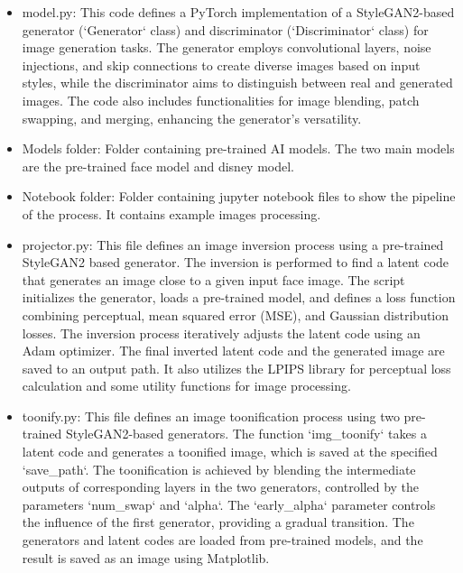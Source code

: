 \documentclass[conference]{IEEEtran}
\begin{document}
\begin{itemize}
                \vspace{3mm}
                \item model.py: This code defines a PyTorch implementation of a StyleGAN2-based generator (`Generator` class) and discriminator (`Discriminator` class) for image generation tasks. The generator employs convolutional layers, noise injections, and skip connections to create diverse images based on input styles, while the discriminator aims to distinguish between real and generated images. The code also includes functionalities for image blending, patch swapping, and merging, enhancing the generator's versatility.\\
                \vspace{3mm}
                \item Models folder: Folder containing pre-trained AI models. The two main models are the pre-trained face model and disney model.\\
                \item Notebook folder: Folder containing jupyter notebook files to show the pipeline of the process. It contains example images processing.\\
                \vspace{3mm}
                \item projector.py: This file defines an image inversion process using a pre-trained StyleGAN2 based generator. The inversion is performed to find a latent code that generates an image close to a given input face image. The script initializes the generator, loads a pre-trained model, and defines a loss function combining perceptual, mean squared error (MSE), and Gaussian distribution losses. The inversion process iteratively adjusts the latent code using an Adam optimizer. The final inverted latent code and the generated image are saved to an output path. It also utilizes the LPIPS library for perceptual loss calculation and some utility functions for image processing. \\
                \vspace{3mm}
                \item toonify.py: This file defines an image toonification process using two pre-trained StyleGAN2-based generators. The function `img\_toonify` takes a latent code and generates a toonified image, which is saved at the specified `save\_path`. The toonification is achieved by blending the intermediate outputs of corresponding layers in the two generators, controlled by the parameters `num\_swap` and `alpha`. The `early\_alpha` parameter controls the influence of the first generator, providing a gradual transition. The generators and latent codes are loaded from pre-trained models, and the result is saved as an image using Matplotlib.\\

\end{itemize}
\end{document}

